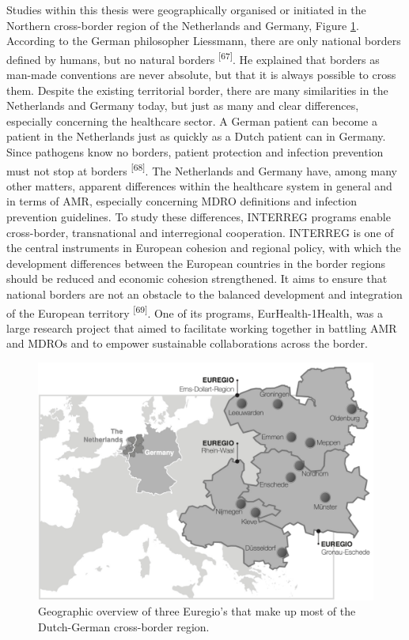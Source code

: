 \documentclass[
]{book}
\begin{document}
Studies within this thesis were geographically organised or initiated in the Northern cross-border region of the Netherlands and Germany, Figure \ref{fig:fig1-5}. According to the German philosopher Liessmann, there are only national borders defined by humans, but no natural borders \textsuperscript{{[}67{]}}. He explained that borders as man-made conventions are never absolute, but that it is always possible to cross them. Despite the existing territorial border, there are many similarities in the Netherlands and Germany today, but just as many and clear differences, especially concerning the healthcare sector. A German patient can become a patient in the Netherlands just as quickly as a Dutch patient can in Germany. Since pathogens know no borders, patient protection and infection prevention must not stop at borders \textsuperscript{{[}68{]}}. The Netherlands and Germany have, among many other matters, apparent differences within the healthcare system in general and in terms of AMR, especially concerning MDRO definitions and infection prevention guidelines. To study these differences, INTERREG programs enable cross-border, transnational and interregional cooperation. INTERREG is one of the central instruments in European cohesion and regional policy, with which the development differences between the European countries in the border regions should be reduced and economic cohesion strengthened. It aims to ensure that national borders are not an obstacle to the balanced development and integration of the European territory \textsuperscript{{[}69{]}}. One of its programs, EurHealth-1Health, was a large research project that aimed to facilitate working together in battling AMR and MDROs and to empower sustainable collaborations across the border.

\begin{figure}

{\centering \includegraphics[width=1\linewidth]{images/01-05} 

}

\caption{Geographic overview of three Euregio’s that make up most of the Dutch-German cross-border region.}\label{fig:fig1-5}
\end{figure}
\end{document}
